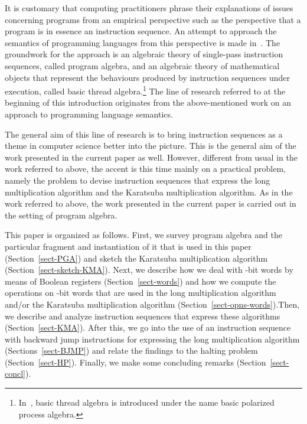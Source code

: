 \documentclass{llncs}
\begin{document}
It is customary that computing practitioners phrase their explanations 
of issues concerning programs from an empirical perspective such as 
the perspective that a program is in essence an instruction sequence.
An attempt to approach the semantics of programming languages from this 
perspective is made in~\cite{BL02a}.
The groundwork for the approach is an algebraic theory of single-pass
instruction sequences, called program algebra, and an algebraic theory
of mathematical objects that represent the behaviours produced by
instruction sequences under execution, called basic thread algebra.\footnote
{In~\cite{BL02a}, basic thread algebra is introduced under the name
 basic polarized process algebra.
}
The line of research referred to at the beginning of this introduction 
originates from the above-mentioned work on an approach to programming 
language semantics.

The general aim of this line of research is to bring instruction 
sequences as a theme in computer science better into the picture.
This is the general aim of the work presented in the current paper as 
well.
However, different from usual in the work referred to above, the accent 
is this time mainly on a practical problem, namely the problem to devise 
instruction sequences that express the long multiplication algorithm and 
the Karatsuba multiplication algorithm.
As in the work referred to above, the work presented in the current 
paper is carried out in the setting of program algebra.

This paper is organized as follows.
First, we survey program algebra and the particular fragment and 
instantiation of it that is used in this paper (Section~\ref{sect-PGA})
and sketch the Karatsuba multiplication algorithm 
(Section~\ref{sect-sketch-KMA}).
Next, we describe how we deal with -bit words by means of Boolean 
registers (Section~\ref{sect-words}) and how we compute the operations 
on -bit words that are used in the long multiplication algorithm 
and/or the Karatsuba multiplication algorithm 
(Section~\ref{sect-opns-words}).\linebreak[2]
Then, we describe and analyze instruction sequences that express these 
algorithms (Section~\ref{sect-KMA}).
After this, we go into the use of an instruction sequence with backward 
jump instructions for expressing the long multiplication algorithm
(Sections~\ref{sect-BJMP}) and relate the findings to the halting 
problem (Section~\ref{sect-HP}). 
Finally, we make some concluding remarks (Section~\ref{sect-concl}).
\end{document}
